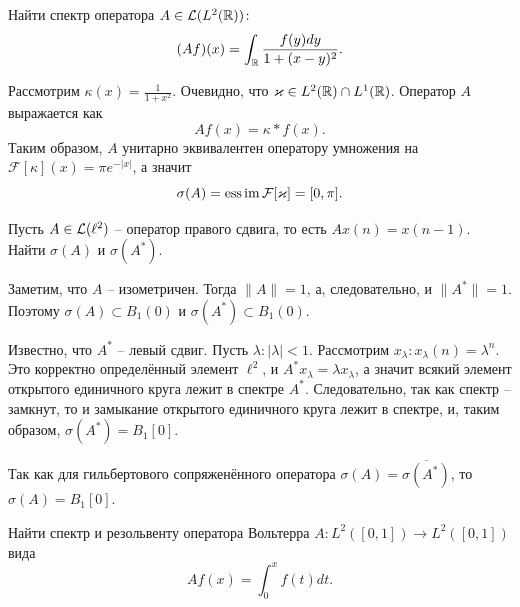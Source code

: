 \begin{task}[7.15]
    Найти спектр оператора $A \in \mathcal{L}(L^2(\mathbb{R}))\colon$
    \[
        (Af)(x) = \int_{\mathbb{R}} \frac{f(y)dy}{1 + (x - y)^2}.
    \]
\end{task}
\begin{solution}
    Рассмотрим $\kappa(x) = \frac{1}{1 + x^2}$. Очевидно, что $\varkappa \in L^2(\mathbb{R}) \cap L^1(\mathbb{R})$.
    Оператор $A$ выражается как 
    \[
        Af(x) = \kappa * f(x).
    \]
    Таким образом, $A$ унитарно эквивалентен оператору умножения на $\mathcal{F}[\kappa](x) = \pi e^{-|x|}$, а значит \[\sigma(A) = \operatorname*{ess\,im} \mathcal{F}[\varkappa] = [0, \pi].\]
\end{solution}
\begin{task}[11.9]
    Пусть $A \in  \mathcal{L}(\ell^2)$ -- оператор правого сдвига, то есть $Ax(n) = x(n - 1)$. Найти $\sigma(A)$ и $\sigma(A^*)$.
\end{task}
\begin{solution}
    Заметим, что $A$ -- изометричен.
    Тогда $\|A\| = 1$, а, следовательно, и $\|A^*\| = 1$.
    Поэтому $\sigma(A) \subset B_1(0)$ и $\sigma(A^*) \subset B_1(0)$.

    Известно, что $A^*$ -- левый сдвиг.
    Пусть $\lambda\colon |\lambda| < 1$.
    Рассмотрим $x_\lambda\colon x_\lambda(n) = \lambda^n$.
    Это корректно определённый элемент $\ell^2$, и $A^*x_\lambda = \lambda x_\lambda$, а значит всякий элемент открытого единичного круга лежит в спектре $A^*$.
    Следовательно, так как спектр -- замкнут, то и замыкание открытого единичного круга лежит в спектре, и, таким образом, $\sigma(A^*) = B_1[0]$.

    Так как для гильбертового сопряженённого оператора $\sigma(A) = \overline{\sigma(A^*)}$, то $\sigma(A) = B_1[0]$.
\end{solution}
\begin{task}
    Найти спектр и резольвенту оператора Вольтерра $A\colon L^2([0, 1]) \to L^2([0, 1])$ вида
    \[
        Af(x) = \int_0^x f(t)dt.
    \]
\end{task}
